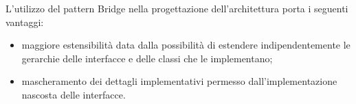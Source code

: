 L’utilizzo del pattern Bridge nella progettazione dell’architettura porta i seguenti vantaggi:
\begin{itemize}
\item maggiore estensibilità data dalla possibilità di estendere indipendentemente le gerarchie delle interfacce e delle classi che le implementano;
\item mascheramento dei dettagli implementativi permesso dall'implementazione nascosta delle interfacce.
\end{itemize}
